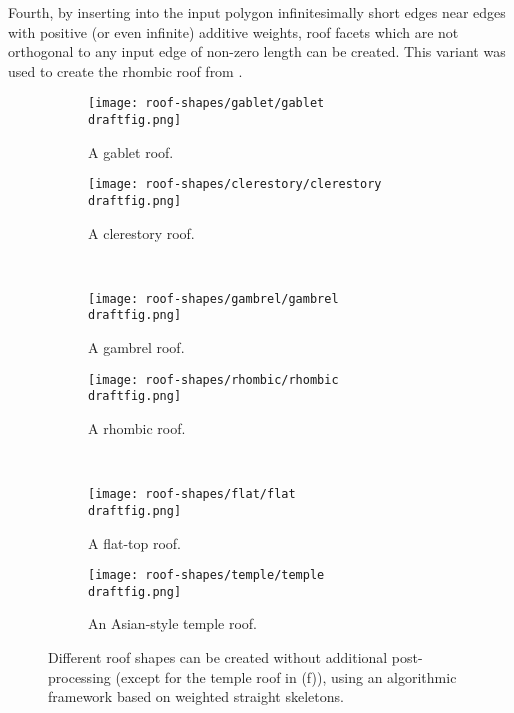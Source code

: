 \documentclass[preprint]{elsarticle}
\newcommand{\draftfig}{.small}
\begin{document}
Fourth, by inserting into the input polygon infinitesimally short edges near
edges with positive (or even infinite) additive weights, roof facets which
are not orthogonal to any input edge of non-zero length can be created.  This
variant was used to create the rhombic roof from .

\begin{figure}[htb!]
  \centering
  \begin{subfigure}[b]{0.48\textwidth}
    \centering
    \texttt{[image: roof-shapes/gablet/gablet\\draftfig.png]}
    \caption[]{A gablet roof.}
    \label{fig:gablet}
  \end{subfigure}
  \hspace{0.1em}
  \begin{subfigure}[b]{0.48\textwidth}
    \centering
    \texttt{[image: roof-shapes/clerestory/clerestory\\draftfig.png]}
    \caption[]{A clerestory roof.}
    \label{fig:clerestory}
  \end{subfigure}
  \\
  \begin{subfigure}[b]{0.48\textwidth}
    \centering
    \texttt{[image: roof-shapes/gambrel/gambrel\\draftfig.png]}
    \caption[]{A gambrel roof.}
    \label{fig:gambrel}
  \end{subfigure}
  \hspace{0.1em}
  \begin{subfigure}[b]{0.48\textwidth}
    \centering
    \texttt{[image: roof-shapes/rhombic/rhombic\\draftfig.png]}
    \caption[]{A rhombic roof.}
    \label{fig:rhombic}
  \end{subfigure}
  \\
  \begin{subfigure}[b]{0.48\textwidth}
    \centering
    \texttt{[image: roof-shapes/flat/flat\\draftfig.png]}
    \caption[]{A flat-top roof.}
    \label{fig:flat_roof}
  \end{subfigure}
  \hspace{0.1em}
  \begin{subfigure}[b]{0.48\textwidth}
    \centering
    \texttt{[image: roof-shapes/temple/temple\\draftfig.png]}
    \caption[]{An Asian-style temple roof.}
    \label{fig:japanese_temple}
  \end{subfigure}

  \caption{Different roof shapes can be created without additional
    post-processing (except for the temple roof in (f)), using an
    algorithmic framework based on weighted straight skeletons.  }
  \label{fig:roof-shapes}
\end{figure}
\end{document}
